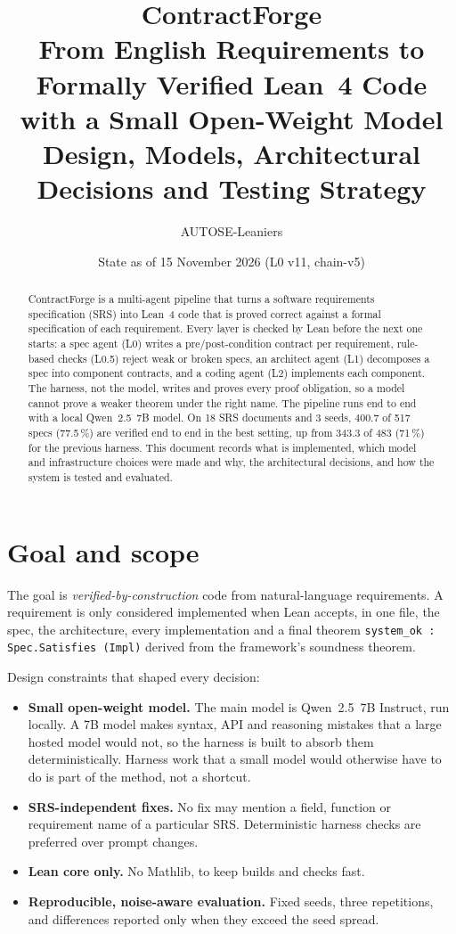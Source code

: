 \documentclass[11pt,a4paper]{article}
\title{\textbf{ContractForge}\\[4pt]
\large From English Requirements to Formally Verified Lean~4 Code with a Small Open-Weight Model\\[2pt]
\normalsize Design, Models, Architectural Decisions and Testing Strategy}
\author{AUTOSE-Leaniers}
\date{State as of 15 November 2026 (L0 v11, chain-v5)}
\newcommand{\code}[1]{\texttt{#1}}
\begin{document}
\maketitle

\begin{abstract}
ContractForge is a multi-agent pipeline that turns a software requirements specification (SRS)
into Lean~4 code that is proved correct against a formal specification of each requirement.
Every layer is checked by Lean before the next one starts: a spec agent (L0) writes a
pre/post-condition contract per requirement, rule-based checks (L0.5) reject weak or broken
specs, an architect agent (L1) decomposes a spec into component contracts, and a coding agent
(L2) implements each component. The harness, not the model, writes and proves every proof
obligation, so a model cannot prove a weaker theorem under the right name. The pipeline runs
end to end with a local Qwen~2.5~7B model. On 18 SRS documents and 3 seeds, 400.7 of 517
specs (77.5\,\%) are verified end to end in the best setting, up from 343.3 of 483 (71\,\%) for
the previous harness. This document records what is implemented, which model and
infrastructure choices were made and why, the architectural decisions, and how the system is
tested and evaluated.
\end{abstract}

\tableofcontents
\newpage

\section{Goal and scope}

The goal is \emph{verified-by-construction} code from natural-language requirements. A
requirement is only considered implemented when Lean accepts, in one file, the spec, the
architecture, every implementation and a final theorem
\code{system\_ok : Spec.Satisfies (Impl)} derived from the framework's soundness theorem.

Design constraints that shaped every decision:
\begin{itemize}
  \item \textbf{Small open-weight model.} The main model is Qwen~2.5~7B Instruct, run locally.
        A 7B model makes syntax, API and reasoning mistakes that a large hosted model would
        not, so the harness is built to absorb them deterministically. Harness work that a
        small model would otherwise have to do is part of the method, not a shortcut.
  \item \textbf{SRS-independent fixes.} No fix may mention a field, function or requirement
        name of a particular SRS. Deterministic harness checks are preferred over prompt changes.
  \item \textbf{Lean core only.} No Mathlib, to keep builds and checks fast.
  \item \textbf{Reproducible, noise-aware evaluation.} Fixed seeds, three repetitions, and
        differences reported only when they exceed the seed spread.
\end{itemize}
\end{document}
